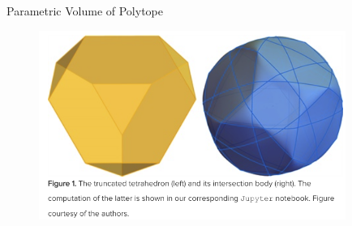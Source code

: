 \documentclass[aspectratio=169,xcolor=dvipsnames]{beamer}
\begin{document}

\begin{frame}{Parametric Volume of Polytope}
    \begin{figure}[h]
\includegraphics[width=10cm]{logos/fig1.png}
\end{figure}
\end{frame}







\end{document}
